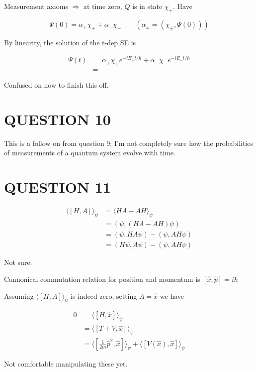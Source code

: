 \documentclass[a4paper]{article}
\begin{document}
Measurement axioms $ \Rightarrow  $ at time zero, $ Q $ is in state $ \chi_{+} $. 
Have

\[ \Psi(0) = \alpha_{+} \chi_{+} + \alpha_{-} \chi_{-} \qquad (\alpha_{\pm} = (\chi_{\pm},\Psi(0) )) \]

By linearity, the solution of the t-dep SE is

\begin{align*}
\Psi(t) & = \alpha_{+} \chi_{+} e^{- i E_{+} t / \hbar } + \alpha_{-} \chi_{-} e^{- i E_{-} t / \hbar }  \\
& = 
\end{align*}

Confused on how to finish this off.



\section{QUESTION 10}

This is a follow on from question 9; I'm not completely sure how the probabilities of measurements of a quantum system evolve with time. 


\section{QUESTION 11}

\begin{align*}
\langle [H,A] \rangle_{\psi} & = \langle HA - AH \rangle_{\psi}  \\
& = (  \psi, (HA - AH)\psi ) \\
& = ( \psi, HA \psi) - ( \psi, AH \psi) \\
& = ( H \psi, A \psi) - ( \psi, AH \psi)
\end{align*}

Not sure. 

Cannonical commutation relation for position and momentum is $ [\hat{x},\hat{p}] = i \hbar $

Assuming $ \langle [H,A] \rangle_{\psi} $ is indeed zero, setting $ A = 
\hat{x} $ we have

\begin{align*}
0 & = \langle [H,\hat{x}] \rangle_{\psi} \\
& = \langle [T + V,\hat{x}] \rangle_{\psi} \\
& = \langle [\frac{1}{2m} \hat{p}^{2},\hat{x}] \rangle_{\psi} + \langle [V(\hat{x}),\hat{x}] \rangle_{\psi}
\end{align*} 

Not comfortable manipulating these yet.
\end{document}
